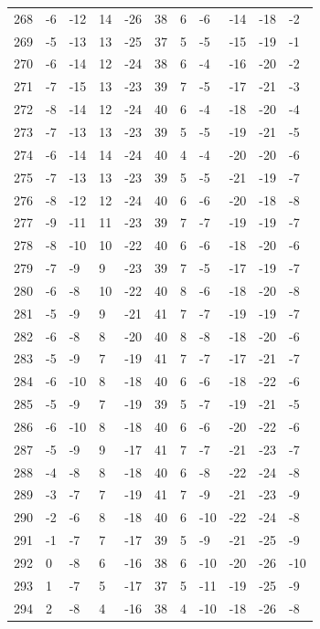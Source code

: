 \begin{table}[H]
\begin{tabular}{lllllllllll}
268 & -6 & -12 & 14 & -26 & 38 & 6 & -6 & -14 & -18 & -2 \\
269 & -5 & -13 & 13 & -25 & 37 & 5 & -5 & -15 & -19 & -1 \\
270 & -6 & -14 & 12 & -24 & 38 & 6 & -4 & -16 & -20 & -2 \\
271 & -7 & -15 & 13 & -23 & 39 & 7 & -5 & -17 & -21 & -3 \\
272 & -8 & -14 & 12 & -24 & 40 & 6 & -4 & -18 & -20 & -4 \\
273 & -7 & -13 & 13 & -23 & 39 & 5 & -5 & -19 & -21 & -5 \\
274 & -6 & -14 & 14 & -24 & 40 & 4 & -4 & -20 & -20 & -6 \\
275 & -7 & -13 & 13 & -23 & 39 & 5 & -5 & -21 & -19 & -7 \\
276 & -8 & -12 & 12 & -24 & 40 & 6 & -6 & -20 & -18 & -8 \\
277 & -9 & -11 & 11 & -23 & 39 & 7 & -7 & -19 & -19 & -7 \\
278 & -8 & -10 & 10 & -22 & 40 & 6 & -6 & -18 & -20 & -6 \\
279 & -7 & -9 & 9 & -23 & 39 & 7 & -5 & -17 & -19 & -7 \\
280 & -6 & -8 & 10 & -22 & 40 & 8 & -6 & -18 & -20 & -8 \\
281 & -5 & -9 & 9 & -21 & 41 & 7 & -7 & -19 & -19 & -7 \\
282 & -6 & -8 & 8 & -20 & 40 & 8 & -8 & -18 & -20 & -6 \\
283 & -5 & -9 & 7 & -19 & 41 & 7 & -7 & -17 & -21 & -7 \\
284 & -6 & -10 & 8 & -18 & 40 & 6 & -6 & -18 & -22 & -6 \\
285 & -5 & -9 & 7 & -19 & 39 & 5 & -7 & -19 & -21 & -5 \\
286 & -6 & -10 & 8 & -18 & 40 & 6 & -6 & -20 & -22 & -6 \\
287 & -5 & -9 & 9 & -17 & 41 & 7 & -7 & -21 & -23 & -7 \\
288 & -4 & -8 & 8 & -18 & 40 & 6 & -8 & -22 & -24 & -8 \\
289 & -3 & -7 & 7 & -19 & 41 & 7 & -9 & -21 & -23 & -9 \\
290 & -2 & -6 & 8 & -18 & 40 & 6 & -10 & -22 & -24 & -8 \\
291 & -1 & -7 & 7 & -17 & 39 & 5 & -9 & -21 & -25 & -9 \\
292 & 0 & -8 & 6 & -16 & 38 & 6 & -10 & -20 & -26 & -10 \\
293 & 1 & -7 & 5 & -17 & 37 & 5 & -11 & -19 & -25 & -9 \\
294 & 2 & -8 & 4 & -16 & 38 & 4 & -10 & -18 & -26 & -8 \\

\end{tabular}
\end{table}
